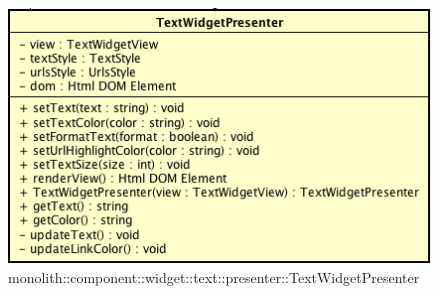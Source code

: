 \label{monolith::component::widget::text::presenter::TextWidgetPresenter}
\begin{figure}[H]
	\centering
	\includegraphics[scale=0.5]{Sezioni/SottosezioniST/img/TextWidgetPresenter.png}
	\caption{monolith::component::widget::text::presenter::TextWidgetPresenter}
\end{figure}


